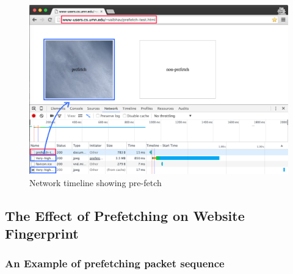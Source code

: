 \begin{figure}[t]
\includegraphics[width=\textwidth]{figures/prefetch-network-edited.png}
\centering
\caption{Network timeline showing pre-fetch}
\label{fig:network}
\end{figure}


\subsection{The Effect of Prefetching on Website Fingerprint}

\subsubsection{An Example of prefetching packet sequence}

